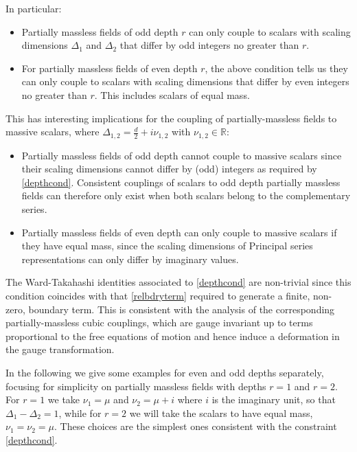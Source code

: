 \documentclass[11pt,a4paper]{article}
\begin{document}
 In particular:
 
 \begin{itemize}
     \item Partially massless fields of odd depth $r$ can only couple to scalars with scaling dimensions $\Delta_1$ and $\Delta_2$ that differ by odd integers no greater than $r$. 
     
     \item For partially massless fields of even depth $r$, the above condition tells us they can only couple to scalars with scaling dimensions that differ by even integers no greater than $r$. This includes scalars of equal mass.

 \end{itemize}
 
 This has interesting implications for the coupling of partially-massless fields to massive scalars, where $\Delta_{1,2} = \frac{d}{2}+i\nu_{1,2}$ with $\nu_{1,2} \in \mathbb{R}$:
 
  \begin{itemize}
     
          \item Partially massless fields of odd depth cannot couple to massive scalars since their scaling dimensions cannot differ by (odd) integers as required by \eqref{depthcond}. Consistent couplings of scalars to odd depth partially massless fields can therefore only exist when both scalars belong to the complementary series. 
     
     \item Partially massless fields of even depth can only couple to massive scalars if they have equal mass, since the scaling dimensions of Principal series representations can only differ by imaginary values.
 \end{itemize}
 
 
 The Ward-Takahashi identities associated to \eqref{depthcond} are non-trivial since this condition coincides with that \eqref{relbdryterm} required to generate a finite, non-zero, boundary term. This is consistent with the analysis \cite{Joung:2012rv,Joung:2012hz} of the corresponding partially-massless cubic couplings, which are gauge invariant up to terms proportional to the free equations of motion and hence induce a deformation in the gauge transformation. 
 
  In the following we give some examples for even and odd depths separately, focusing for simplicity on partially massless fields with depths $r=1$ and $r=2$. For $r=1$ we take $\nu_1=\mu$ and $\nu_2=\mu+i$ where $i$ is the imaginary unit, so that $\Delta_1-\Delta_2=1$, while for $r=2$ we will take the scalars to have equal mass, $\nu_1=\nu_2=\mu$. These choices are the simplest ones consistent with the constraint \eqref{depthcond}.
\end{document}
